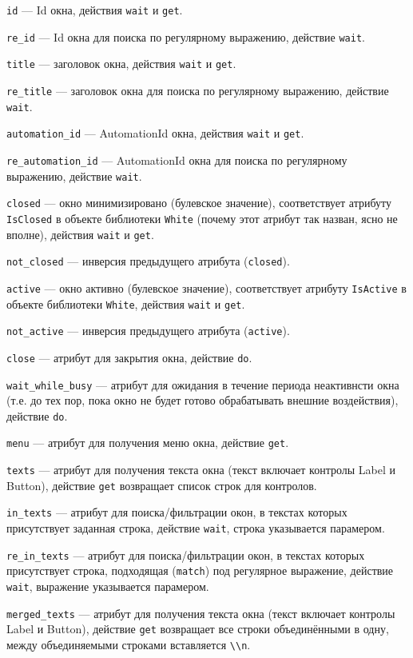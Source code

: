 \documentclass[11pt]{book} %
\begin{document}
\verb'id' --- Id окна, действия \verb|wait| и \verb|get|.

\verb're_id' --- Id окна для поиска по регулярному выражению, действие \verb|wait|.

\verb'title' --- заголовок окна, действия \verb|wait| и \verb|get|.

\verb're_title' --- заголовок окна для поиска по регулярному выражению, действие \verb|wait|.

\verb'automation_id' --- AutomationId окна, действия \verb|wait| и \verb|get|.

\verb're_automation_id' --- AutomationId окна для поиска по регулярному выражению, действие \verb|wait|.


\verb'closed' --- окно минимизировано (булевское значение), соответствует атрибуту \verb|IsClosed| в объекте библиотеки \verb|White| (почему этот атрибут так назван, ясно не вполне), действия \verb|wait| и \verb|get|.

\verb'not_closed' --- инверсия предыдущего атрибута (\verb|closed|).

\verb'active' --- окно активно (булевское значение), соответствует атрибуту \verb|IsActive| в объекте библиотеки \verb|White|, действия \verb|wait| и \verb|get|.

\verb'not_active' --- инверсия предыдущего атрибута (\verb|active|).

\verb'close' --- атрибут для закрытия окна, действие \verb|do|.

\verb'wait_while_busy' --- атрибут для ожидания в течение периода неактивнсти окна (т.е. до тех пор, пока окно не будет готово обрабатывать внешние воздействия), действие \verb|do|.

\verb|menu| --- атрибут для получения меню окна, действие \verb|get|.


\verb'texts' --- атрибут для получения текста окна (текст включает контролы Label и Button), действие \verb|get| возвращает список строк для контролов.


\verb'in_texts' --- атрибут для поиска/фильтрации окон, в текстах которых присутствует заданная строка, действие \verb|wait|, строка указывается парамером.
 
\verb're_in_texts' --- атрибут для поиска/фильтрации окон, в текстах которых присутствует строка, подходящая (\verb|match|) под регулярное выражение, действие \verb|wait|, выражение указывается парамером.

\verb'merged_texts' --- атрибут для получения текста окна (текст включает контролы Label и Button), действие \verb|get| возвращает все строки объединёнными в одну, между объединяемыми строками вставляется \verb'\\n'.
\end{document}
